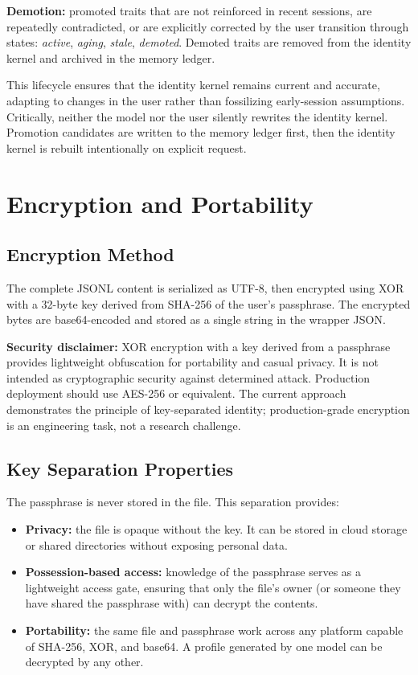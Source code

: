 \documentclass[11pt,a4paper]{article}
\begin{document}
\textbf{Demotion:} promoted traits that are not reinforced in recent sessions, are repeatedly contradicted, or are explicitly corrected by the user transition through states: \textit{active}, \textit{aging}, \textit{stale}, \textit{demoted}. Demoted traits are removed from the identity kernel and archived in the memory ledger.

This lifecycle ensures that the identity kernel remains current and accurate, adapting to changes in the user rather than fossilizing early-session assumptions. Critically, neither the model nor the user silently rewrites the identity kernel. Promotion candidates are written to the memory ledger first, then the identity kernel is rebuilt intentionally on explicit request.

\section{Encryption and Portability}

\subsection{Encryption Method}

The complete JSONL content is serialized as UTF-8, then encrypted using XOR with a 32-byte key derived from SHA-256 of the user's passphrase. The encrypted bytes are base64-encoded and stored as a single string in the wrapper JSON.

\textbf{Security disclaimer:} XOR encryption with a key derived from a passphrase provides lightweight obfuscation for portability and casual privacy. It is not intended as cryptographic security against determined attack. Production deployment should use AES-256 or equivalent. The current approach demonstrates the principle of key-separated identity; production-grade encryption is an engineering task, not a research challenge.

\subsection{Key Separation Properties}

The passphrase is never stored in the file. This separation provides:

\begin{itemize}
    \item \textbf{Privacy:} the file is opaque without the key. It can be stored in cloud storage or shared directories without exposing personal data.
    \item \textbf{Possession-based access:} knowledge of the passphrase serves as a lightweight access gate, ensuring that only the file's owner (or someone they have shared the passphrase with) can decrypt the contents.
    \item \textbf{Portability:} the same file and passphrase work across any platform capable of SHA-256, XOR, and base64. A profile generated by one model can be decrypted by any other.
\end{itemize}
\end{document}
